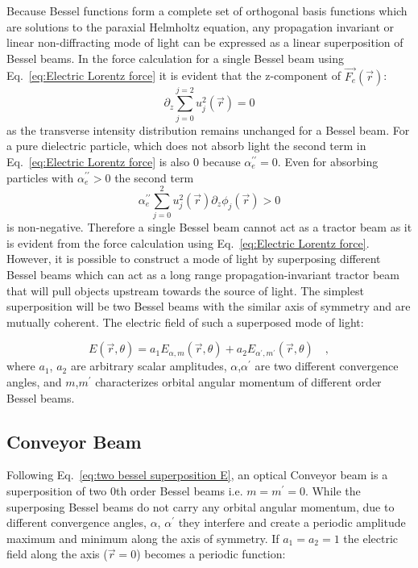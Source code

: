 Because Bessel functions form a complete set of orthogonal basis functions which are solutions to the paraxial Helmholtz equation, any propagation invariant or linear non-diffracting mode of light can be expressed as a linear superposition \cite{Ruffner:14, Lee:10, ruffner2012prl} of Bessel beams. In the force calculation for a single Bessel beam using Eq.~\eqref{eq:Electric Lorentz force} it is evident that the z-component of $\vec{F_e}(\vec{r})$:
\begin{equation}
\label{eq:Single Bessel gradient force}
\partial _{z} \sum ^{j=2}_{j=0} u_{j}^2(\vec{r}) = 0
\end{equation}
as the transverse intensity distribution remains unchanged for a Bessel beam. For a pure dielectric particle, which does not absorb light the second term in Eq.~\eqref{eq:Electric Lorentz force} is also $0$ because $\alpha _{e}^{\prime \prime} = 0$. Even for absorbing particles with $\alpha _{e}^{\prime \prime} > 0$ the second term 
\begin{equation}
\label{eq:Single Bessel 2nd term}
\alpha _{e}^{\prime\prime}\sum ^{2}_{j=0} u_{j}^2(\vec{r}) \partial _{z}\phi _{j}(\vec{r}) >0
\end{equation}
is non-negative. Therefore a single Bessel beam cannot act as a tractor beam as it is evident from the force calculation using Eq.~\eqref{eq:Electric Lorentz force}. However, it is possible to construct a mode of light by superposing different Bessel beams which can act as a long range propagation-invariant tractor beam that will pull objects upstream towards the source of light. The simplest superposition will be two Bessel beams with the similar axis of symmetry and are mutually coherent. The electric field of such a superposed mode of light:

\begin{equation}
\label{eq:two bessel superposition E}
E(\vec{r}, \theta) = a_{1} E_{\alpha, m}(\vec{r},\theta) + a_{2} E_{\alpha ^{\prime},m^{\prime}}(\vec{r},\theta) \quad ,
\end{equation}
where $a_1$, $a_2$ are arbitrary scalar amplitudes, $\alpha$,$\alpha ^{\prime}$ are two different convergence angles, and $m$,$m^{\prime}$ characterizes orbital angular momentum of different order Bessel beams.


\subsection{Conveyor Beam}
Following Eq.~\eqref{eq:two bessel superposition E}, an optical Conveyor beam is a superposition of two $0$th order Bessel beams i.e. $m=m^{\prime} = 0$. While the superposing Bessel beams do not carry any orbital angular momentum, due to different convergence angles, $\alpha$, $\alpha ^{\prime}$ they interfere and create a periodic amplitude maximum and minimum along the axis of symmetry. If $a_1 = a_2 = 1$ the electric field along the axis ($\vec{r}=0$) becomes a periodic function:

